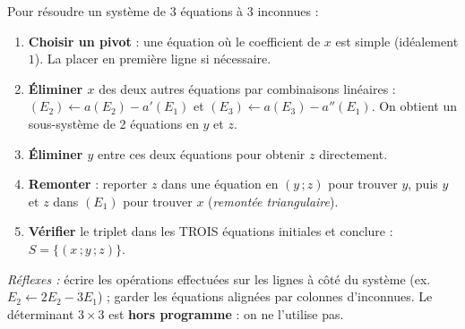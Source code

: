 \documentclass[11pt]{article}
\begin{document}
\begin{methode}
Pour résoudre un système de 3 équations à 3 inconnues :
\begin{enumerate}
\item \textbf{Choisir un pivot} : une équation où le coefficient de $x$ est simple (idéalement $1$). La placer en première ligne si nécessaire.
\item \textbf{Éliminer $x$} des deux autres équations par combinaisons linéaires : $(E_2) \leftarrow a(E_2) - a'(E_1)$ et $(E_3) \leftarrow a(E_3) - a''(E_1)$. On obtient un sous-système de 2 équations en $y$ et $z$.
\item \textbf{Éliminer $y$} entre ces deux équations pour obtenir $z$ directement.
\item \textbf{Remonter} : reporter $z$ dans une équation en $(y\,;z)$ pour trouver $y$, puis $y$ et $z$ dans $(E_1)$ pour trouver $x$ (\emph{remontée triangulaire}).
\item \textbf{Vérifier} le triplet dans les TROIS équations initiales et conclure : $S = \{(x\,;y\,;z)\}$.
\end{enumerate}
\emph{Réflexes :} écrire les opérations effectuées sur les lignes à côté du système (ex. $E_2 \leftarrow 2E_2 - 3E_1$) ; garder les équations alignées par colonnes d'inconnues. Le déterminant $3\times 3$ est \textbf{hors programme} : on ne l'utilise pas.
\end{methode}
\end{document}

